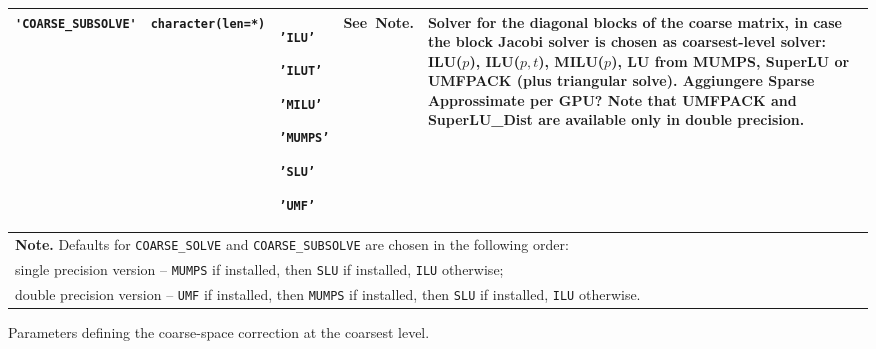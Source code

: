 \begin{center}
\begin{tabular}{|p{3.9cm}|l|p{1.7cm}|p{1.7cm}|p{8.6cm}|}
\verb|'COARSE_SUBSOLVE'| & \verb|character(len=*)|
                         & \texttt{'ILU'} \par \texttt{'ILUT'} \par \texttt{'MILU'} \par
                            \texttt{'MUMPS'} \par \texttt{'SLU'} \par \texttt{'UMF'}
                         & See~Note.
                         & Solver for the diagonal blocks of the coarse matrix,
                           in case the block Jacobi solver
                           is chosen as coarsest-level solver: ILU($p$), ILU($p,t$),
                           MILU($p$), LU from MUMPS, SuperLU or UMFPACK
			  (plus triangular solve). {\bf Aggiungere Sparse Approssimate per GPU?}
                          Note that UMFPACK and SuperLU\_Dist
                          are available only in double precision. \\
\hline
\multicolumn{5}{|l|}{{\bfseries Note.} Defaults for \texttt{COARSE\_SOLVE} and
\texttt{COARSE\_SUBSOLVE} are chosen in the following  order:} \\
\multicolumn{5}{|l|}{single precision version -- \texttt{MUMPS} if installed,
                               then \texttt{SLU} if installed,
                               \texttt{ILU} otherwise;}\\
\multicolumn{5}{|l|}{double precision version -- \texttt{UMF} if installed,
                               then \texttt{MUMPS} if installed, then \texttt{SLU} if
                               installed, \texttt{ILU} otherwise.}\\
\hline
\end{tabular}
\end{center}
\caption{Parameters defining the coarse-space correction at the coarsest
level.\label{tab:p_coarse}}
\esideways

